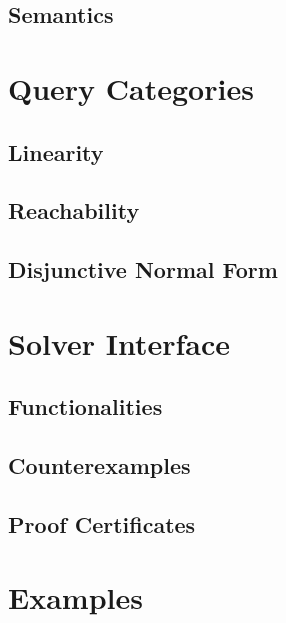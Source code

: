 \documentclass[12pt,a4paper]{report}
\begin{document}
\section{Semantics}\label{sec:semantics}


\chapter{Query Categories}

\section{Linearity}\label{sec:linearity}

\section{Reachability}\label{sec:reachability}

\section{Disjunctive Normal Form}\label{sec:dnf}


\chapter{Solver Interface}\label{sec:solver_interface}

\section{Functionalities}\label{sec:functionalities}

\section{Counterexamples}\label{sec:counterexamples}

\section{Proof Certificates}\label{sec:proof_certificates}


\chapter{Examples}\label{sec:examples}

\end{document}
